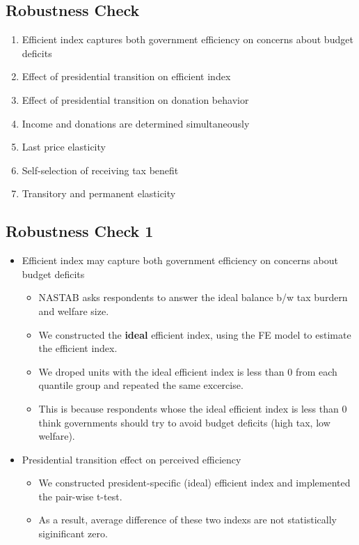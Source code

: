 \documentclass[ review  , 3p ]{elsarticle}
\providecommand{\tightlist}{%
  \setlength{\itemsep}{0pt}\setlength{\parskip}{0pt}}
\begin{document}
  \hypertarget{robustness-check-1}{%
  \subsection{Robustness Check}\label{robustness-check-1}}
  
  \begin{enumerate}
  \def\labelenumi{\arabic{enumi}.}
  \tightlist
  \item
    Efficient index captures both government efficiency on concerns about budget deficits
  \item
    Effect of presidential transition on efficient index
  \item
    Effect of presidential transition on donation behavior
  \item
    Income and donations are determined simultaneously
  \item
    Last price elasticity
  \item
    Self-selection of receiving tax benefit
  \item
    Transitory and permanent elasticity
  \end{enumerate}
  
  \hypertarget{robustness-check-1-1}{%
  \subsection{Robustness Check 1}\label{robustness-check-1-1}}
  
  \begin{itemize}
  \tightlist
  \item
    Efficient index may capture both government efficiency on concerns about budget deficits
  
    \begin{itemize}
    \tightlist
    \item
      NASTAB asks respondents to answer the ideal balance b/w tax burdern and welfare size.
    \item
      We constructed the \textbf{ideal} efficient index, using the FE model to estimate the efficient index.
    \item
      We droped units with the ideal efficient index is less than 0 from each quantile group and repeated the same excercise.
    \item
      This is because respondents whose the ideal efficient index is less than 0 think governments should try to avoid budget deficits (high tax, low welfare).
    \end{itemize}
  \item
    Presidential transition effect on perceived efficiency
  
    \begin{itemize}
    \tightlist
    \item
      We constructed president-specific (ideal) efficient index and implemented the pair-wise t-test.
    \item
      As a result, average difference of these two indexs are not statistically siginificant zero.
    \end{itemize}
  \end{itemize}
  
\end{document}
